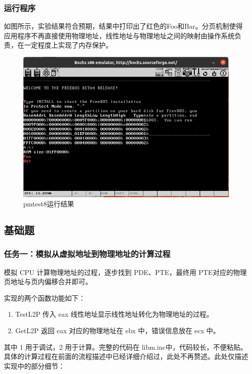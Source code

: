 \documentclass[UTF8,12pt]{ctexart}
\begin{document}
    \subsubsection{运行程序}
    如图所示，实验结果符合预期，结果中打印出了红色的Foo和Bar。分页机制使得应用程序不再直接使用物理地址，线性地址与物理地址之间的映射由操作系统负责，在一定程度上实现了内存保护。
    
    
    \begin{figure}[H]
        \centering
        \includegraphics[width=12cm]{images/pmtest8_result.png}
        \caption{pmtest8运行结果}
        \label{pmtest8运行结果}
    \end{figure}
    
    \subsection{基础题\label{Basic page switch}} 
    \subsubsection{任务一：模拟从虚拟地址到物理地址的计算过程}
    模拟 CPU 计算物理地址的过程，逐步找到 PDE、PTE，最终用 PTE对应的物理页地址与页内偏移合并即可。
    
    实现的两个函数功能如下：
    
    \begin{enumerate}
        \item TestL2P 传入 eax 线性地址显示线性地址转化为物理地址的过程。
        \item GetL2P 返回 eax 对应的物理地址在 ebx 中，错误信息放在 ecx 中。
    \end{enumerate}
    
    其中 1 用于调试，2 用于计算。完整的代码在 libm.inc中，代码较长，不便粘贴。具体的计算过程在前面的流程描述中已经详细介绍过，此处不再赘述。此处仅描述实现中的部分细节：
    
\end{document}
